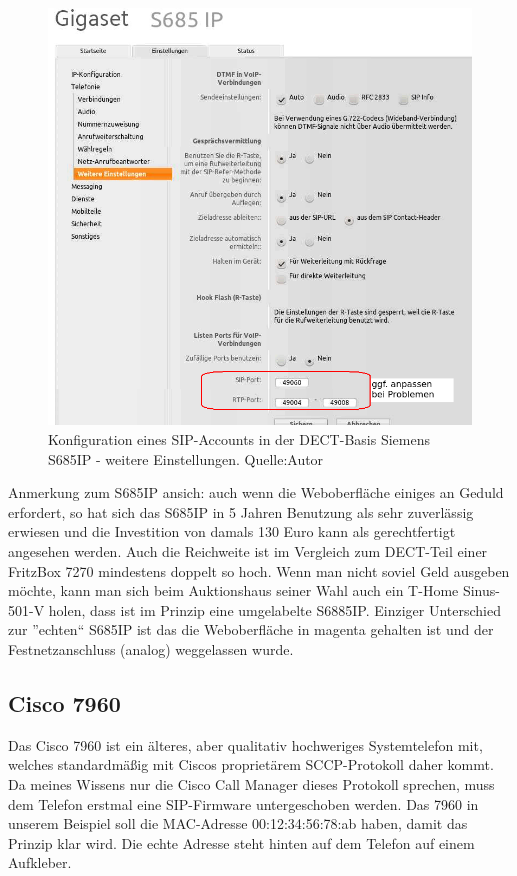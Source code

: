 \documentclass[a4paper,12pt]{scrbook}
\begin{document}
\begin{figure}[H]
\begin{center}
\includegraphics[width=.8\hsize]{./images/voip-client-s685ip-02.png}
\end{center}
\caption[Konfiguration eines SIP-Accounts in der DECT-Basis Siemens S685IP - weitere Einstellungen.]
{\label{voip-client-nexus5}Konfiguration eines SIP-Accounts in der DECT-Basis Siemens S685IP - weitere Einstellungen. Quelle:Autor}
\end{figure}

Anmerkung zum S685IP ansich: auch wenn die Weboberfläche einiges an Geduld erfordert, so hat sich das S685IP in 5 Jahren Benutzung als sehr zuverlässig 
erwiesen und die Investition von damals 130 Euro kann als gerechtfertigt angesehen werden. Auch die Reichweite ist im Vergleich zum DECT-Teil einer FritzBox
7270 mindestens doppelt so hoch. Wenn man nicht soviel Geld ausgeben möchte, kann man sich beim Auktionshaus seiner Wahl auch ein T-Home Sinus-501-V holen, dass
ist im Prinzip eine umgelabelte S6885IP. Einziger Unterschied zur ''echten`` S685IP ist das die Weboberfläche in magenta gehalten ist und der Festnetzanschluss (analog)
weggelassen wurde.

\subsection{Cisco 7960}
Das Cisco 7960 ist ein älteres, aber qualitativ hochweriges Systemtelefon mit, welches standardmäßig mit Ciscos proprietärem SCCP-Protokoll daher kommt. Da meines Wissens nur die Cisco Call Manager dieses Protokoll 
sprechen, muss dem Telefon erstmal eine SIP-Firmware untergeschoben werden. Das 7960 in unserem Beispiel soll die MAC-Adresse 00:12:34:56:78:ab haben, damit das Prinzip klar wird. Die echte Adresse steht hinten auf dem Telefon auf 
einem Aufkleber. 
\end{document}
